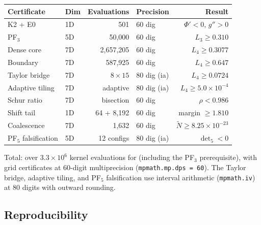 \documentclass[11pt,a4paper]{amsart}
\theoremstyle{definition}
\theoremstyle{remark}
\newcommand{\Ntilde}{\tilde{N}}
\begin{document}
\begin{center}
\begin{tabular}{@{}llrlr@{}}
\toprule
Certificate & Dim & Evaluations & Precision & Result \\
\midrule
K2 + E0              & 1D  & 501           & 60 dig & $\Phi'<0$, $g''>0$ \\
PF$_3$               & 5D  & 50,000        & 60 dig & $L_3 \ge 0.310$ \\
Dense core           & 7D  & 2,657,205     & 60 dig & $L_4 \ge 0.3077$ \\
Boundary             & 7D  & 587,925       & 60 dig & $L_4 \ge 0.647$ \\
Taylor bridge        & 7D  & $8\times 15$  & 80 dig (ia) & $L_4 \ge 0.0724$ \\
Adaptive tiling      & 7D  & adaptive      & 80 dig (ia) & $L_4 \ge 5.0 \times 10^{-4}$ \\
Schur ratio          & 7D  & bisection     & 60 dig & $\rho < 0.986$ \\
Shift tail           & 1D  & 64 + 8,192    & 60 dig & margin $\ge 1.810$ \\
Coalescence          & 7D  & 1,632         & 60 dig & $\Ntilde \ge 8.25\!\times\!10^{-23}$ \\
PF$_5$ falsification & 5D  & 12 configs    & 80 dig (ia) & $\det_5 < 0$ \\
\bottomrule
\end{tabular}
\end{center}

Total: over $3.3 \times 10^6$ kernel evaluations for 
(including the PF$_3$ prerequisite),
with grid certificates at $60$-digit multiprecision
(\texttt{mpmath.mp.dps\,=\,60}).
The Taylor bridge, adaptive tiling, and PF$_5$ falsification
use interval arithmetic (\texttt{mpmath.iv})
at $80$ digits with outward rounding.

\subsection{Reproducibility}
\end{document}
